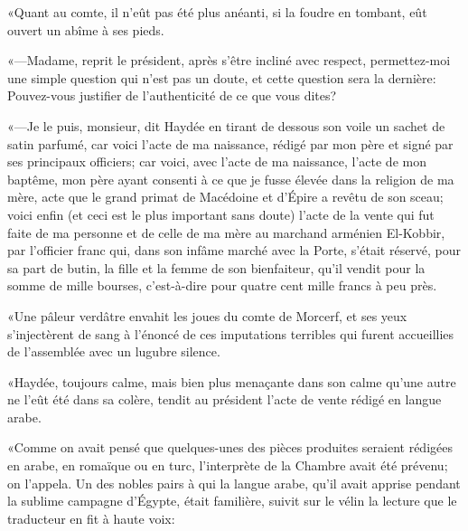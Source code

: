 «Quant au comte, il n'eût pas été plus anéanti, si la foudre en tombant, eût ouvert un abîme à ses pieds. 

«—Madame, reprit le président, après s'être incliné avec respect, permettez-moi une simple question qui n'est pas un doute, et cette question sera la dernière: Pouvez-vous justifier de l'authenticité de ce que vous dites? 

«—Je le puis, monsieur, dit Haydée en tirant de dessous son voile un sachet de satin parfumé, car voici l'acte de ma naissance, rédigé par mon père et signé par ses principaux officiers; car voici, avec l'acte de ma naissance, l'acte de mon baptême, mon père ayant consenti à ce que je fusse élevée dans la religion de ma mère, acte que le grand primat de Macédoine et d'Épire a revêtu de son sceau; voici enfin (et ceci est le plus important sans doute) l'acte de la vente qui fut faite de ma personne et de celle de ma mère au marchand arménien El-Kobbir, par l'officier franc qui, dans son infâme marché avec la Porte, s'était réservé, pour sa part de butin, la fille et la femme de son bienfaiteur, qu'il vendit pour la somme de mille bourses, c'est-à-dire pour quatre cent mille francs à peu près. 

«Une pâleur verdâtre envahit les joues du comte de Morcerf, et ses yeux s'injectèrent de sang à l'énoncé de ces imputations terribles qui furent accueillies de l'assemblée avec un lugubre silence. 

«Haydée, toujours calme, mais bien plus menaçante dans son calme qu'une autre ne l'eût été dans sa colère, tendit au président l'acte de vente rédigé en langue arabe. 

«Comme on avait pensé que quelques-unes des pièces produites seraient rédigées en arabe, en romaïque ou en turc, l'interprète de la Chambre avait été prévenu; on l'appela. Un des nobles pairs à qui la langue arabe, qu'il avait apprise pendant la sublime campagne d'Égypte, était familière, suivit sur le vélin la lecture que le traducteur en fit à haute voix: 

